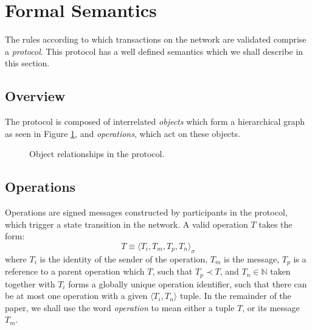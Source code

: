 \section{Formal Semantics}


The rules according to which transactions on the \oscoin{} network are
validated comprise a \emph{protocol}. This protocol has a well defined semantics
which we shall describe in this section.

\subsection{Overview} The \oscoin{} protocol is composed of interrelated
\emph{objects} which form a hierarchical graph as seen in Figure
\ref{object-relationships}, and \emph{operations}, which act on these objects.

\medskip

\begin{figure}[htp]
\bigskip
\caption{Object relationships in the \oscoin{} protocol.
\label{object-relationships}}
\end{figure}

\subsection{Operations}

Operations are signed messages constructed by participants in the protocol,
which trigger a state transition in the network. A valid operation $T$ takes
the form:
\[
    T \equiv \langle T_i, T_m, T_p, T_n \rangle_{\sigma}
\]
where $T_i$ is the identity of the sender of the operation, $T_m$ is the
message, $T_p$ is a reference to a parent operation which $T$, such that $T_p
\prec T$, and $T_n \in \mathbb{N}$ taken together with $T_i$ forms a globally
unique operation identifier, such that there can be at most one operation with
a given $\langle T_i, T_n \rangle$ tuple. In the remainder of the paper, we shall
use the word \emph{operation} to mean either a tuple $T$, or its message $T_m$.

